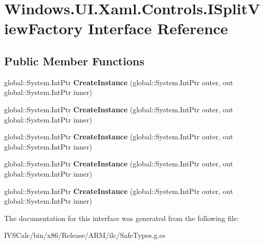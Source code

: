 \hypertarget{interface_windows_1_1_u_i_1_1_xaml_1_1_controls_1_1_i_split_view_factory}{}\section{Windows.\+U\+I.\+Xaml.\+Controls.\+I\+Split\+View\+Factory Interface Reference}
\label{interface_windows_1_1_u_i_1_1_xaml_1_1_controls_1_1_i_split_view_factory}
\subsection*{Public Member Functions}
\begin{DoxyCompactItemize}
\item 
\mbox{\label{interface_windows_1_1_u_i_1_1_xaml_1_1_controls_1_1_i_split_view_factory_adc468d79eaffa3113d5f2d757f9b1b98}} 
global\+::\+System.\+Int\+Ptr {\bfseries Create\+Instance} (global\+::\+System.\+Int\+Ptr outer, out global\+::\+System.\+Int\+Ptr inner)
\item 
\mbox{\label{interface_windows_1_1_u_i_1_1_xaml_1_1_controls_1_1_i_split_view_factory_adc468d79eaffa3113d5f2d757f9b1b98}} 
global\+::\+System.\+Int\+Ptr {\bfseries Create\+Instance} (global\+::\+System.\+Int\+Ptr outer, out global\+::\+System.\+Int\+Ptr inner)
\item 
\mbox{\label{interface_windows_1_1_u_i_1_1_xaml_1_1_controls_1_1_i_split_view_factory_adc468d79eaffa3113d5f2d757f9b1b98}} 
global\+::\+System.\+Int\+Ptr {\bfseries Create\+Instance} (global\+::\+System.\+Int\+Ptr outer, out global\+::\+System.\+Int\+Ptr inner)
\item 
\mbox{\label{interface_windows_1_1_u_i_1_1_xaml_1_1_controls_1_1_i_split_view_factory_adc468d79eaffa3113d5f2d757f9b1b98}} 
global\+::\+System.\+Int\+Ptr {\bfseries Create\+Instance} (global\+::\+System.\+Int\+Ptr outer, out global\+::\+System.\+Int\+Ptr inner)
\item 
\mbox{\label{interface_windows_1_1_u_i_1_1_xaml_1_1_controls_1_1_i_split_view_factory_adc468d79eaffa3113d5f2d757f9b1b98}} 
global\+::\+System.\+Int\+Ptr {\bfseries Create\+Instance} (global\+::\+System.\+Int\+Ptr outer, out global\+::\+System.\+Int\+Ptr inner)
\end{DoxyCompactItemize}


The documentation for this interface was generated from the following file\+:\begin{DoxyCompactItemize}
\item 
I\+V\+S\+Calc/bin/x86/\+Release/\+A\+R\+M/ilc/Safe\+Types.\+g.\+cs\end{DoxyCompactItemize}
